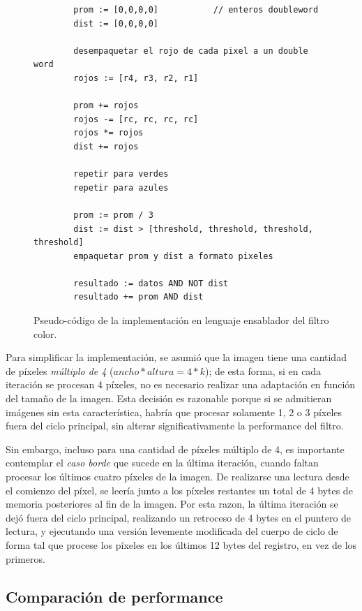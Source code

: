 \begin{figure}[h]
	\begin{mdframed}
	\begin{center}
		\begin{lstlisting}
		prom := [0,0,0,0] 			// enteros doubleword
		dist := [0,0,0,0]
	
		desempaquetar el rojo de cada pixel a un double word
		rojos := [r4, r3, r2, r1]
	
		prom += rojos
		rojos -= [rc, rc, rc, rc]
		rojos *= rojos
		dist += rojos
	
		repetir para verdes
		repetir para azules
	
		prom := prom / 3
		dist := dist > [threshold, threshold, threshold, threshold]
		empaquetar prom y dist a formato pixeles

		resultado := datos AND NOT dist
		resultado += prom AND dist
		\end{lstlisting}
	\end{center}
	\end{mdframed}
	\caption{Pseudo-código de la implementación en lenguaje ensablador del filtro color.}
	\label{fig:pseudocodigo-filtro-color}
\end{figure}

Para simplificar la implementación, se asumió que la imagen tiene una cantidad de píxeles \emph{múltiplo de 4} ($ancho * altura = 4 * k$); de esta forma, si en cada iteración se procesan 4 píxeles, no es necesario realizar una adaptación en función del tamaño de la imagen. Esta decisión es razonable porque si se admitieran imágenes sin esta característica, habría que procesar solamente 1, 2 o 3 píxeles fuera del ciclo principal, sin alterar significativamente la performance del filtro.

Sin embargo, incluso para una cantidad de píxeles múltiplo de 4, es importante contemplar el \emph{caso borde} que sucede en la última iteración, cuando faltan procesar los últimos cuatro píxeles de la imagen. De realizarse una lectura desde el comienzo del píxel, se leería junto a los píxeles restantes un total de 4 bytes de memoria posteriores al fin de la imagen. Por esta razon, la última iteración se dejó fuera del ciclo principal, realizando un retroceso de 4 bytes en el puntero de lectura, y ejecutando una versión levemente modificada del cuerpo de ciclo de forma tal que procese los píxeles en los últimos 12 bytes del registro, en vez de los primeros.

\subsection{Comparación de performance}
\label{sub:comparaci_n_de_performance_fcolor}

